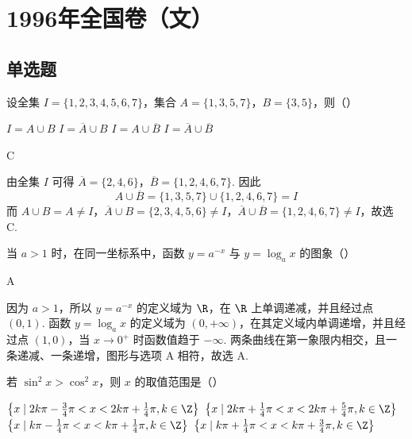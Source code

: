 \chapter{1996年全国卷（文）}
\section{单选题}

\begin{problem}
设全集 \(I = \{1, 2, 3, 4, 5, 6, 7\}\)，集合 \(A = \{1, 3, 5, 7\}\)，\(B = \{3, 5\}\)，则（\quad）

\choices
    {\(I = A\cup B\)}
    {\(I = \overline{A}\cup B\)}
    {\(I = A\cup \overline{B}\)}
    {\(I = \overline{A}\cup \overline{B}\)}
\end{problem}

\begin{answer}
C
\end{answer}

\begin{solution}
由全集 \(I\) 可得 \(\overline{A}=\{2,4,6\}\)，\(\overline{B}=\{1,2,4,6,7\}\). 因此
\[
A\cup\overline{B}=\{1,3,5,7\}\cup\{1,2,4,6,7\}=I
\]
而 \(A\cup B=A\ne I\)，\(\overline{A}\cup B=\{2,3,4,5,6\}\ne I\)，\(\overline{A}\cup\overline{B}=\{1,2,4,6,7\}\ne I\)，故选 C.
\end{solution}

\begin{problem}
当 \(a > 1\) 时，在同一坐标系中，函数 \(y = a^{-x}\) 与 \(y = \log_a x\) 的图象（\quad）

    {}
    {}
    {}
\end{problem}

\begin{answer}
A
\end{answer}

\begin{solution}
因为 \(a>1\)，所以 \(y=a^{-x}\) 的定义域为 \(\R\)，在 \(\R\) 上单调递减，并且经过点 \((0,1)\). 函数 \(y=\log_a x\) 的定义域为 \((0,+\infty)\)，在其定义域内单调递增，并且经过点 \((1,0)\)，当 \(x\to0^+\) 时函数值趋于 \(-\infty\). 两条曲线在第一象限内相交，且一条递减、一条递增，图形与选项 A 相符，故选 A.
\end{solution}

\begin{problem}
若 \(\sin^2 x > \cos^2 x\)，则 \(x\) 的取值范围是（\quad）

\choices
    {\(\left\{x\mid 2k\pi -\frac{3}{4}\pi < x < 2k\pi +\frac{1}{4}\pi ,k\in \Z\right\}\)}
    {\(\left\{x\mid 2k\pi +\frac{1}{4}\pi < x < 2k\pi +\frac{5}{4}\pi ,k\in \Z\right\}\)}
    {\(\left\{x\mid k\pi -\frac{1}{4}\pi < x < k\pi + \frac{1}{4}\pi ,k\in \Z\right\}\)}
    {\(\left\{x\mid k\pi +\frac{1}{4}\pi < x < k\pi +\frac{3}{4}\pi ,k\in \Z\right\}\)}
\end{problem}

